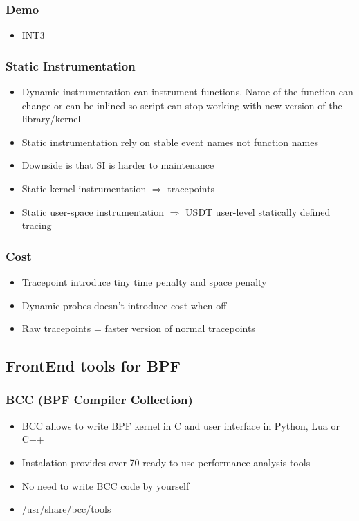 \documentclass{beamer}
\begin{document}
\begin{frame}
	\frametitle{Demo}
	\begin{Huge}
  \begin{itemize}
    \item<1-> INT3
	\end{itemize}	
\end{Huge}
\end{frame}

\begin{frame}
  \frametitle{Static Instrumentation}
	\begin{itemize}
	  \item<1-> Dynamic instrumentation can instrument functions. Name of the function can change or can be inlined so script can stop working with new version of the library/kernel
		\item<2-> Static instrumentation rely on stable event names not function names
		\item<3-> Downside is that SI is harder to maintenance
		\item<4-> Static kernel instrumentation $\Rightarrow$ tracepoints
		\item<5-> Static user-space instrumentation $\Rightarrow$ USDT user-level statically defined tracing
	\end{itemize}
\end{frame}

\begin{frame}
  \frametitle{Cost}
	\begin{Large}
		\begin{itemize}
			\item<+-> Tracepoint introduce tiny time penalty and space penalty
			\item<+-> Dynamic probes doesn't introduce cost when off
			\item<+-> Raw tracepoints = faster version of normal tracepoints
		\end{itemize}
	\end{Large}
\end{frame}


\subsection{FrontEnd tools for BPF}
\begin{frame}
  \frametitle{BCC (BPF Compiler Collection)}
	\begin{Large}
  \begin{itemize}
    \item<+-> BCC allows to write BPF kernel in C and user interface in Python, Lua or C++
    \item<+-> Instalation provides over 70 ready to use performance analysis tools
    \item<+-> No need to write BCC code by yourself
    \item<+-> /usr/share/bcc/tools
  \end{itemize}
\end{Large}
\end{frame}
\end{document}
